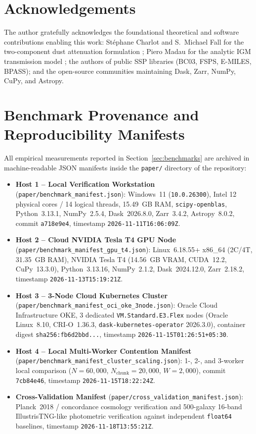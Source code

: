\documentclass[preprint,12pt,authoryear]{elsarticle}
\begin{document}
\section*{Acknowledgements}
The author gratefully acknowledges the foundational theoretical and software contributions enabling this work: St\'ephane Charlot and S.~Michael Fall for the two-component dust attenuation formulation \citep{charlot2000simple}; Piero Madau for the analytic IGM transmission model \citep{madau1995radiative}; the authors of public SSP libraries (BC03, FSPS, E-MILES, BPASS); and the open-source communities maintaining Dask, Zarr, NumPy, CuPy, and Astropy.

\appendix
\section{Benchmark Provenance and Reproducibility Manifests}
\label{app:provenance}

All empirical measurements reported in Section~\ref{sec:benchmarks} are archived in machine-readable JSON manifests inside the \texttt{paper/} directory of the repository:

\begin{itemize}
\item \textbf{Host 1 -- Local Verification Workstation} (\texttt{paper/benchmark\_manifest.json}): Windows~11 (\texttt{10.0.26300}), Intel 12 physical cores / 14 logical threads, 15.49~GB RAM, \texttt{scipy-openblas}, Python~3.13.1, NumPy~2.5.4, Dask~2026.8.0, Zarr~3.4.2, Astropy~8.0.2, commit \texttt{a718e9e4}, timestamp \texttt{2026-11-11T16:06:09Z}.
\item \textbf{Host 2 -- Cloud NVIDIA Tesla T4 GPU Node} (\texttt{paper/benchmark\_manifest\_gpu\_t4.json}): Linux~6.18.55+ x86\_64 (2C/4T, 31.35~GB RAM), NVIDIA Tesla T4 (14.56~GB VRAM, CUDA~12.2, CuPy~13.3.0), Python~3.13.16, NumPy~2.1.2, Dask~2024.12.0, Zarr~2.18.2, timestamp \texttt{2026-11-13T15:19:21Z}.
\item \textbf{Host 3 -- 3-Node Cloud Kubernetes Cluster} (\texttt{paper/benchmark\_manifest\_oci\_oke\_3node.json}): Oracle Cloud Infrastructure OKE, 3 dedicated \texttt{VM.Standard.E3.Flex} nodes (Oracle Linux~8.10, CRI-O~1.36.3, \texttt{dask-kubernetes-operator} 2026.3.0), container digest \texttt{sha256:fb6d2bbd...}, timestamp \texttt{2026-11-15T01:26:51+05:30}.
\item \textbf{Host 4 -- Local Multi-Worker Contention Manifest} (\texttt{paper/benchmark\_manifest\_cluster\_scaling.json}): 1-, 2-, and 3-worker local comparison ($N=60{,}000$, $N_{\text{chunk}}=20{,}000$, $W=2{,}000$), commit \texttt{7cb84e46}, timestamp \texttt{2026-11-15T18:22:24Z}.
\item \textbf{Cross-Validation Manifest} (\texttt{paper/cross\_validation\_manifest.json}): Planck~2018 / concordance cosmology verification and 500-galaxy 16-band IllustrisTNG-like photometric verification against independent \texttt{float64} baselines, timestamp \texttt{2026-11-18T13:55:21Z}.
\end{itemize}
\end{document}
